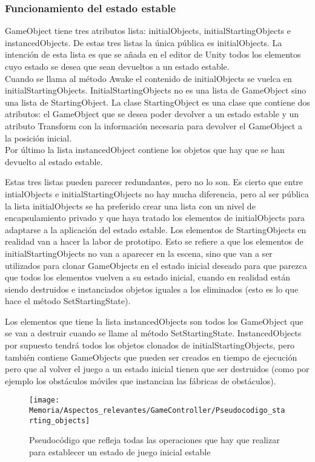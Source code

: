 \subsubsection{Funcionamiento del estado estable}
GameObject tiene tres atributos lista: initialObjects, initialStartingObjects e instancedObjects. De estas tres listas la única pública es initialObjects. La intención de esta lista es que se añada en el editor de Unity todos los elementos cuyo estado se desea que sean devueltos a un estado estable.\\
Cuando se llama al método Awake el contenido de initialObjects se vuelca en initialStartingObjects. InitialStartingObjects no es una lista de GameObject sino una lista de StartingObject. La clase StartingObject es una clase que contiene dos atributos: el GameObject que se desea poder devolver a un estado estable y un atributo Transform con la información necesaria para devolver el GameObject a la posición inicial.\\
Por último la lista instancedObject contiene los objetos que hay que se han devuelto al estado estable.

Estas tres listas pueden parecer redundantes, pero no lo son. Es cierto que entre intialObjects e initialStartingObjects no hay mucha diferencia, pero al ser pública la lista initialObjects se ha preferido crear una lista con un nivel de encapsulamiento privado y que haya tratado los elementos de initialObjects para adaptarse a la aplicación del estado estable. Los elementos de StartingObjects en realidad van a hacer la labor de prototipo. Esto se refiere a que los elementos de initialStartingObjects no van a aparecer en la escena, sino que van a ser utilizados para clonar GameObjects en el estado inicial deseado para que parezca que todos los elementos vuelven a su estado inicial, cuando en realidad están siendo destruidos e instanciados objetos iguales a los eliminados (esto es lo que hace el método SetStartingState).

Los elementos que tiene la lista instancedObjects son todos los GameObject que se van a destruir cuando se llame al método SetStartingState. InstancedObjects por supuesto tendrá todos los objetos clonados de initialStartingObjects, pero también contiene GameObjects que pueden ser creados en tiempo de ejecución pero que al volver el juego a un estado inicial tienen que ser destruidos (como por ejemplo los obstáculos móviles que instancian las fábricas de obstáculos).

\begin{figure}[h]
\centering
\texttt{[image: Memoria/Aspectos\_relevantes/GameController/Pseudocodigo\_starting\_objects]}
\caption{Pseudocódigo que refleja todas las operaciones que hay que realizar para establecer un estado de juego inicial estable}
\end{figure}

